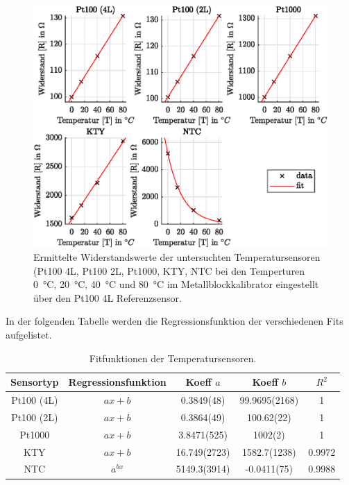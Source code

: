 \begin{figure}[H]
	\centering
	\includegraphics[height=0.25\textheight]{../MLAB/Widerstandsgeraden.eps}
	\caption[Ermittelte Widerstandswerte der untersuchten Temperatursensoren ]{Ermittelte Widerstandswerte der untersuchten Temperatursensoren (Pt100 4L, Pt100 2L, Pt1000, KTY, NTC bei den Temperturen \SI{0}{\celsius}, \SI{20}{\celsius}, \SI{40}{\celsius} und \SI{80}{\celsius} im Metallblockkalibrator eingestellt über den Pt100 4L Referenzsensor. }
	\label{fig:Widerstand}
\end{figure}

In der folgenden Tabelle werden die Regressionsfunktion der verschiedenen Fits aufgelistet. 
\begin{table}[H]
	\centering
	\caption{Fitfunktionen der Temperatursensoren.}
	\label{tab:FitFun}
	\begin{tabular}{ccS[separate-uncertainty,table-parse-only,table-figures-uncertainty = 1]S[separate-uncertainty,table-parse-only,table-figures-uncertainty = 1]S}
		
		Sensortyp & Regressionsfunktion & {Koeff $a$} & {Koeff $b$} & {$R^2$} \\
		\hline
		
		Pt100 (4L) & $ax+b$ & 0.3849(48) & 99.9695(2168) & 1 \\
		Pt100 (2L) & $ax+b$ & 0.3864(49) & 100.62(22) & 1 \\
		Pt1000 & $ax+b$ & 3.8471(525) & 1002(2) & 1 \\
		KTY & $ax+b$ & 16.749(2723) & 1582.7(1238) & 0.9972 \\
		NTC & $a^{bx}$ & 5149.3(3914) & -0.0411(75) & 0.9988 \\
		
	\end{tabular} 
\end{table}

